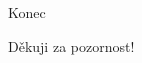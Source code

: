 \documentclass[pdf,slideColor,fyma]{beamer}
\begin{document}
\begin{frame}{Konec}
	\begin{center}
		Děkuji za pozornost!
		\medskip
		\begin{center}
  		\end{center}
	\end{center}
\end{frame}
\end{document}
